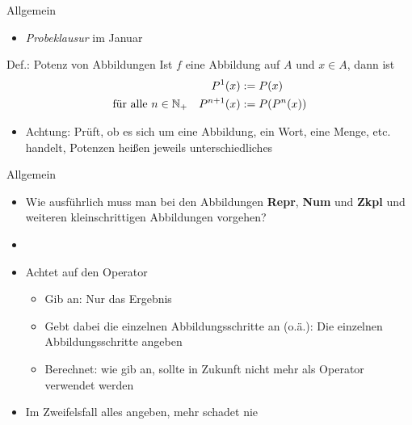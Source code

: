 \newcommand{\lul}[2]{
	\temporal<2>{#1}{\textcolor{red}{#1}}{\textcolor{kit-green100}{#2}}
}

\newcommand{\lulz}[1]{\lul{#1}{#1}}




\begin{frame}{Allgemein}
    \begin{itemize}
    	\item \emph{Probeklausur} im Januar
    \end{itemize}
    \pause
    \begin{block}{Def.: Potenz von Abbildungen}
    	Ist $f$ eine Abbildung auf $A$ und $x \in A$, dann ist
    	\begin{align*}
    		P^1(x) &:= P(x) \\
    		\text{für alle } n\in \mathbb{N}_+ \quad P^{n+1}(x) &:= P(P^n(x))
    	\end{align*}
    \end{block}

    \begin{itemize}
    	\item \alert{Achtung}: Prüft, ob es sich um eine Abbildung, ein Wort, eine Menge, etc. handelt, Potenzen heißen jeweils unterschiedliches
    \end{itemize}

\end{frame}

\begin{frame}{Allgemein}
\begin{itemize}
	\item Wie ausführlich muss man bei den Abbildungen \textbf{Repr}, \textbf{Num} und \textbf{Zkpl} und weiteren kleinschrittigen Abbildungen vorgehen?
	\item[]
	\item Achtet auf den Operator
	\begin{itemize}
		\item Gib an: Nur das Ergebnis
		\item Gebt dabei die einzelnen Abbildungsschritte an (o.ä.): Die einzelnen Abbildungsschritte angeben
		\item Berechnet: wie gib an, sollte in Zukunft nicht mehr als Operator verwendet werden
	\end{itemize}
	\item Im Zweifelsfall alles angeben, mehr schadet nie
\end{itemize}
\end{frame}




